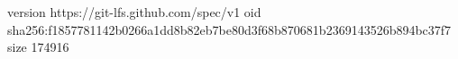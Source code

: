 version https://git-lfs.github.com/spec/v1
oid sha256:f1857781142b0266a1dd8b82eb7be80d3f68b870681b2369143526b894bc37f7
size 174916
